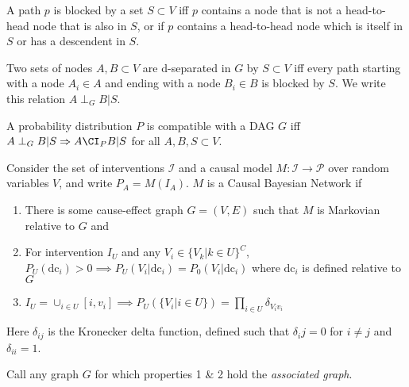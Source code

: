 \begin{definition}
A path $p$ is blocked by a set $S\subset V$ iff $p$ contains a node that is not a head-to-head node that is also in $S$, or if $p$ contains a head-to-head node which is itself in $S$ or has a descendent in $S$.
\end{definition}

\begin{definition}[d-separation]\label{def:dsep}
Two sets of nodes $A,B\subset V$ are d-separated in $G$ by $S\subset V$ iff every path starting with a node $A_i\in A$ and ending with a node $B_i\in B$ is blocked by $S$. We write this relation $A \perp_G B | S$.
\end{definition}


\begin{definition}[Compatibility]\label{def:compatibility}
A probability distribution $P$ is compatible with a DAG $G$ iff $A\perp_G B |S \Rightarrow A\CI_P B | S$ for all $A, B, S \subset V$.
\end{definition}


\begin{definition}\label{def:CBN}
Consider the set of interventions $\mathcal{I}$ and a causal model $M:\mathcal{I}\to\mathcal{P}$ over random variables $V$, and write $P_A=M(I_A)$. $M$ is a Causal Bayesian Network if
\begin{enumerate}
    \item There is some cause-effect graph $G=(V,E)$ such that $M$ is Markovian relative to $G$ and
    \item For intervention $I_U$ and any $V_i \in \{V_k|k\in U\}^C$, $P_U(\mathrm{dc}_i) > 0 \implies P_U(V_i|\mathrm{dc}_i) = P_0(V_i|\mathrm{dc}_i)$ where $\mathrm{dc}_i$ is defined relative to $G$
    \item $I_U = \cup_{i\in U}[i,v_i] \implies P_U(\{V_i|i\in U\}) = \prod_{i\in U} \delta_{V_iv_i}$
\end{enumerate}
Here $\delta_{ij}$ is the Kronecker delta function, defined such that $\delta_ij=0$ for $i\neq j$ and $\delta_{ii} = 1$.

Call any graph $G$ for which properties 1 \& 2 hold the \emph{associated graph}.
\end{definition}



